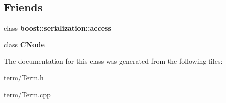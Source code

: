\subsection*{\-Friends}
\begin{DoxyCompactItemize}
\item 
\hypertarget{classTerm_ac98d07dd8f7b70e16ccb9a01abf56b9c}{class {\bfseries boost\-::serialization\-::access}}\label{classTerm_ac98d07dd8f7b70e16ccb9a01abf56b9c}

\item 
\hypertarget{classTerm_a0657a422d4ddc5f4a0ff56931b7d2767}{class {\bfseries \-C\-Node}}\label{classTerm_a0657a422d4ddc5f4a0ff56931b7d2767}

\end{DoxyCompactItemize}


\-The documentation for this class was generated from the following files\-:\begin{DoxyCompactItemize}
\item 
term/\-Term.\-h\item 
term/\-Term.\-cpp\end{DoxyCompactItemize}
